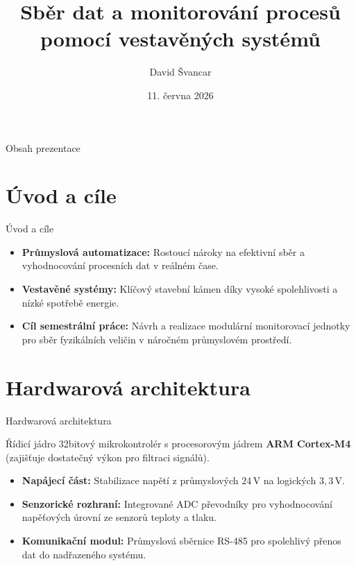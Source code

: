 \documentclass[FM,aspect169]{tulpresentation}
\title{Sběr dat a monitorování procesů pomocí vestavěných systémů}
\author{David Švancar}
\institute{FM TUL}
\date{11. června 2026}
\begin{document}
 

\TULtitleframe

\begin{frame}{Obsah prezentace} 
  \tableofcontents[sections={1-}]
\end{frame} 


\section{Úvod a cíle}
\begin{frame}{Úvod a cíle}
  \begin{itemize}
    \item \textbf{Průmyslová automatizace:} Rostoucí nároky na efektivní sběr a vyhodnocování procesních dat v reálném čase.
    \item \textbf{Vestavěné systémy:} Klíčový stavební kámen díky vysoké spolehlivosti a nízké spotřebě energie.
    \item \textbf{Cíl semestrální práce:} Návrh a realizace modulární monitorovací jednotky pro sběr fyzikálních veličin v náročném průmyslovém prostředí.
  \end{itemize}
\end{frame}

\section{Hardwarová architektura}
\begin{frame}{Hardwarová architektura}
  \begin{block}{Řídicí jádro}
    32bitový mikrokontrolér s procesorovým jádrem \textbf{ARM Cortex-M4} (zajišťuje dostatečný výkon pro filtraci signálů).
  \end{block}
  \begin{itemize}
    \item \textbf{Napájecí část:} Stabilizace napětí z průmyslových $24\,\mathrm{V}$ na logických $3,3\,\mathrm{V}$.
    \item \textbf{Senzorické rozhraní:} Integrované ADC převodníky pro vyhodnocování napěťových úrovní ze senzorů teploty a tlaku.
    \item \textbf{Komunikační modul:} Průmyslová sběrnice RS-485 pro spolehlivý přenos dat do nadřazeného systému.
  \end{itemize}
\end{frame}
\end{document}
